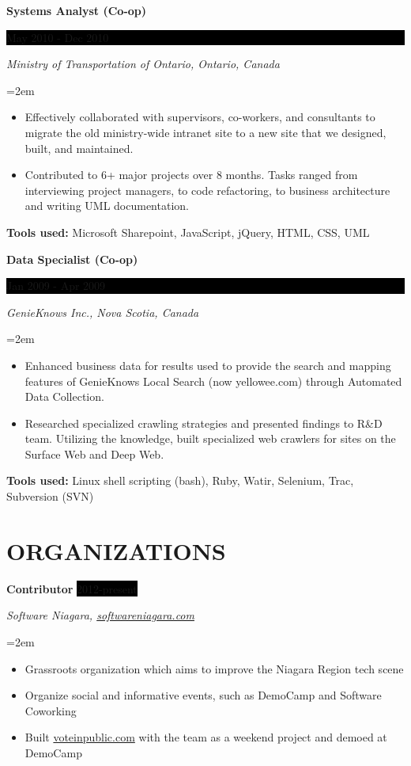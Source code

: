 \documentclass[paper=a4,fontsize=11pt]{scrartcl} %
\newcommand{\sepspace}{\vspace*{1em}}		%
\newcommand{\NewPart}[1]{\section*{\uppercase{#1}}}
\newcommand{\EducationEntry}[4]{
		\noindent \textbf{#1} \hfill      %
		\colorbox{Black}{%
			\parbox{8.0em}{%
			\hfill\color{White}#2}} \par  %
		\noindent \textit{#3} \par        %
		\noindent\hangindent=2em\hangafter=0 \small #4 %
		\normalsize \par}
\newcommand{\WorkEntry}[4]{				  %
		\noindent \textbf{#1} \hfill      %
		\colorbox{Black}{%
			\parbox{9em}{%
			\hfill\color{White}#2}} \par  %
        \noindent \textit{#3} \par        %
		\noindent\hangindent=2em\hangafter=0 \small #4 %
		\normalsize \par}
\newcommand{\OrganizationEntry}[4]{		  %
		\noindent \textbf{#1} \hfill      %
		\colorbox{Black}{\color{White}#2} \par  %
		\noindent \textit{#3} \par              %
		\noindent\hangindent=2em\hangafter=0 \small #4 %
		\normalsize \par}
\begin{document}
\WorkEntry{Systems Analyst (Co-op)}{May 2010 - Dec 2010}
{Ministry of Transportation of Ontario, Ontario, Canada}
{
 \begin{itemize} \itemsep -1pt
   \item Effectively collaborated with supervisors, co-workers, and
   consultants to migrate the old ministry-wide intranet site to a new
   site that we designed, built, and maintained.
   \item Contributed to 6+ major projects over 8 months.
   Tasks ranged from interviewing project managers, to code refactoring,
   to business architecture and writing UML documentation.
 \end{itemize}
 \textbf{Tools used:} Microsoft Sharepoint, JavaScript, jQuery, HTML, CSS, UML
} %
\sepspace

\WorkEntry{Data Specialist (Co-op)}{Jan 2009 - Apr 2009}
{GenieKnows Inc., Nova Scotia, Canada}
{
 \begin{itemize} \itemsep -1pt
   \item Enhanced business data for results used to provide the search
   and mapping features of GenieKnows Local Search (now yellowee.com)
   through Automated Data Collection.
   \item Researched specialized crawling strategies and presented findings
   to R\&D team. Utilizing the knowledge, built specialized web crawlers
   for sites on the Surface Web and Deep Web.
 \end{itemize}
 \textbf{Tools used:} Linux shell scripting (bash), Ruby, Watir, Selenium, Trac, Subversion (SVN)
}

\NewPart{Organizations}{}

\OrganizationEntry{Contributor}{2012-present}
{Software Niagara, \url{softwareniagara.com}}
{
 \begin{itemize} \itemsep -1pt
   \item Grassroots organization which aims to improve the Niagara Region tech scene 
   \item Organize social and informative events, such as DemoCamp and Software Coworking
   \item Built \url{voteinpublic.com} with the team as a weekend project and demoed at DemoCamp
 \end{itemize}
}
\sepspace
\end{document}
